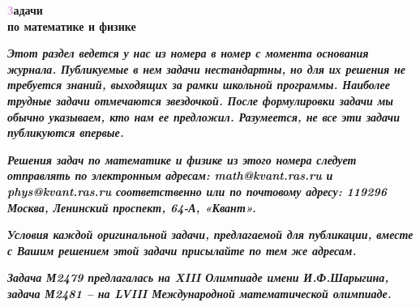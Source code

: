 \documentclass[a4paper,12pt]{article}
\begin{document}
\thispagestyle{empty}

\noindent
{}

\begin{center}
    \vspace{-0.3em}
    {\fontsize{28}{15}\selectfont
    \textcolor{Plum}{\textbf{З}}\textbf{адачи}} \\
    {\fontsize{28}{15}\selectfont
    \textbf{по математике и физике}}
    \vspace{-0.3em}
\end{center}

\small{\textbf{\textit{
    Этот раздел ведется у нас из номера в номер с момента основания журнала. Публикуемые
    в нем задачи нестандартны, но для их решения не требуется знаний, выходящих за рамки
    школьной программы. Наиболее трудные задачи отмечаются звездочкой. После формулировки 
    задачи мы обычно указываем, кто нам ее предложил. Разумеется, не все эти задачи 
    публикуются впервые.}}}

\small{\textbf{\textit{
    Решения задач по математике и физике из этого номера следует отправлять по электронным 
    адресам: math@kvant.ras.ru и phys@kvant.ras.ru соответственно или по почтовому адресу: 
    119296 Москва, Ленинский проспект, 64-А, «Квант».}}}

\small{\textbf{\textit{
    Условия каждой оригинальной задачи, предлагаемой для публикации, вместе с Вашим 
    решением этой задачи присылайте по тем же адресам.}}}

\small{\textbf{\textit{
    Задача М2479 предлагалась на XIII Олимпиаде имени И.Ф.Шарыгина, задача М2481 – на LVIII 
    Международной математической олимпиаде.}}}

\vspace{0.5em}
\normalsize
\end{document}
